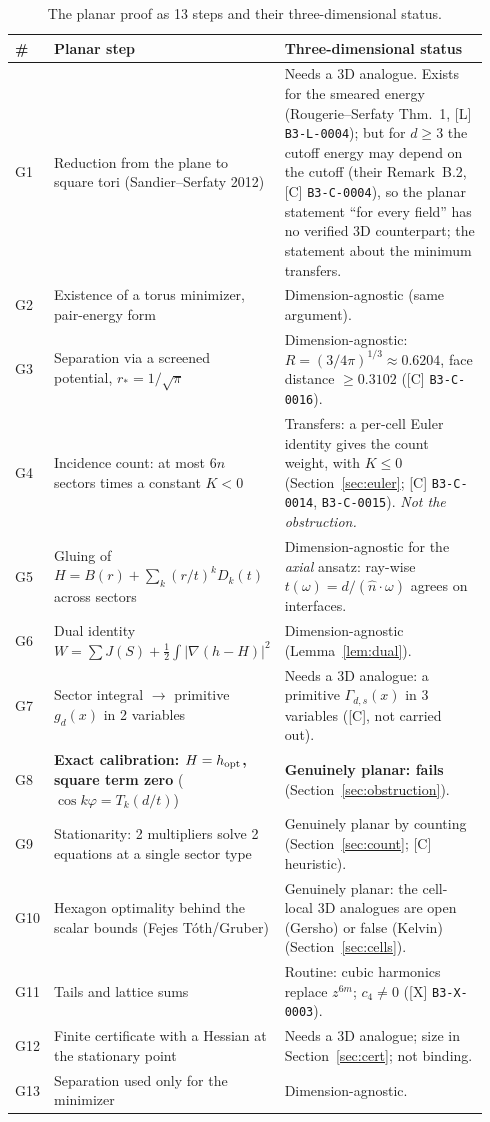 \documentclass[10pt]{article}
\newcommand{\tier}[1]{\textsf{[#1]}}
\newcommand{\cid}[1]{\texttt{B3-#1}}
\theoremstyle{remark}
\begin{document}
\begin{table}[h]
\centering\small
\begin{tabular}{@{}p{0.04\linewidth}p{0.36\linewidth}p{0.54\linewidth}@{}}
\toprule
\# & Planar step & Three-dimensional status\\
\midrule
G1 & Reduction from the plane to square tori (Sandier--Serfaty 2012) & Needs a 3D analogue. Exists for the smeared energy (Rougerie--Serfaty Thm.~1, \tier{L} \cid{L-0004}); but for $d\ge3$ the cutoff energy may depend on the cutoff (their Remark~B.2, \tier{C} \cid{C-0004}), so the planar statement ``for every field'' has no verified 3D counterpart; the statement about the minimum transfers.\\
G2 & Existence of a torus minimizer, pair-energy form & Dimension-agnostic (same argument).\\
G3 & Separation via a screened potential, $r_*=1/\sqrt\pi$ & Dimension-agnostic: $R=(3/4\pi)^{1/3}\approx0.6204$, face distance $\ge0.3102$ (\tier{C} \cid{C-0016}).\\
G4 & Incidence count: at most $6n$ sectors times a constant $K<0$ & Transfers: a per-cell Euler identity gives the count weight, with $K\le0$ (Section~\ref{sec:euler}; \tier{C} \cid{C-0014}, \cid{C-0015}). \emph{Not the obstruction.}\\
G5 & Gluing of $H=B(r)+\sum_k(r/t)^kD_k(t)$ across sectors & Dimension-agnostic for the \emph{axial} ansatz: ray-wise $t(\omega)=d/(\hat n\!\cdot\!\omega)$ agrees on interfaces.\\
G6 & Dual identity $W=\sum J(S)+\tfrac12\!\int|\nabla(h-H)|^2$ & Dimension-agnostic (Lemma~\ref{lem:dual}).\\
G7 & Sector integral $\to$ primitive $g_d(x)$ in 2 variables & Needs a 3D analogue: a primitive $\Gamma_{d,s}(x)$ in 3 variables (\tier{C}, not carried out).\\
G8 & \textbf{Exact calibration: $H=h_{\rm opt}$, square term zero} ($\cos k\varphi=T_k(d/t)$) & \textbf{Genuinely planar: fails} (Section~\ref{sec:obstruction}).\\
G9 & Stationarity: 2 multipliers solve 2 equations at a single sector type & Genuinely planar by counting (Section~\ref{sec:count}; \tier{C} heuristic).\\
G10 & Hexagon optimality behind the scalar bounds (Fejes T\'oth/Gruber) & Genuinely planar: the cell-local 3D analogues are open (Gersho) or false (Kelvin) (Section~\ref{sec:cells}).\\
G11 & Tails and lattice sums & Routine: cubic harmonics replace $z^{6m}$; $c_4\ne0$ (\tier{X} \cid{X-0003}).\\
G12 & Finite certificate with a Hessian at the stationary point & Needs a 3D analogue; size in Section~\ref{sec:cert}; not binding.\\
G13 & Separation used only for the minimizer & Dimension-agnostic.\\
\bottomrule
\end{tabular}
\caption{The planar proof as 13 steps and their three-dimensional status.}\label{tab:steps}
\end{table}
\end{document}
